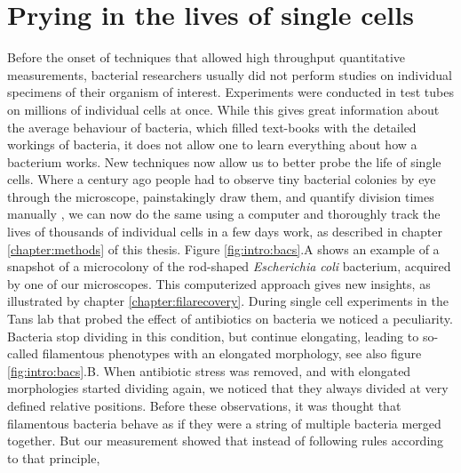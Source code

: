\section{Prying in the lives of single cells}

%
%
Before the onset of techniques that allowed high throughput quantitative measurements, bacterial researchers usually did not perform studies on individual specimens of their organism of interest.
%
Experiments 
were conducted in test tubes on millions of individual cells at once.
%
While this gives great information about the average behaviour of bacteria, 
which filled text-books with the detailed workings of bacteria,
it does not allow one to learn everything about how a bacterium works.
%
%
New techniques now allow us to better probe the life of single cells.
%
Where a century ago people had to observe tiny bacterial colonies by eye through the microscope, painstakingly draw them, and quantify division times manually \cite{Kelly1932},
we can now do the same using a computer and 
thoroughly track the lives of thousands of individual cells in a few days work, as described in chapter \ref{chapter:methods} of this thesis.
%
Figure \ref{fig:intro:bacs}.A shows an example of a snapshot of a microcolony of the rod-shaped \textit{Escherichia coli} bacterium, acquired by one of our microscopes.
%
This computerized approach gives new insights, as illustrated by chapter \ref{chapter:filarecovery}.
%
During single cell experiments in the Tans lab that probed the effect of antibiotics on \ecoli bacteria we noticed a peculiarity. %
%
Bacteria stop dividing in this condition, but continue elongating, leading to so-called filamentous phenotypes with an elongated morphology, see also figure \ref{fig:intro:bacs}.B.
%
When antibiotic stress was removed, and \ecoli with elongated morphologies started dividing again, 
we noticed that 
they always divided at very defined relative positions.
%
Before these observations, it was thought that filamentous bacteria behave as if they were a string of multiple bacteria merged together.
%
But our measurement showed that instead of following rules according to that principle, 
